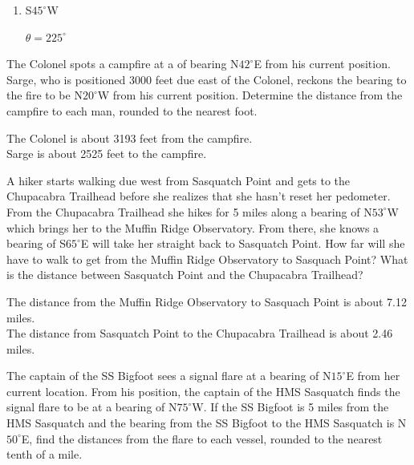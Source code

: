 \documentclass{ximera}
\begin{document}
\begin{question}
\begin{problem}
\begin{enumerate}
\item S$45^{\circ}$W

\begin{solution}
$\theta = 225^{\circ}$
\end{solution}


\end{enumerate}

\end{problem}

\begin{problem}
The Colonel spots a campfire at a of bearing N$42^{\circ}$E from his current position.  Sarge, who is positioned 3000 feet due east of the Colonel, reckons the bearing to the fire to be N$20^{\circ}$W from his current position.  Determine the distance from the campfire to each man, rounded to the nearest foot.

\begin{solution}
The Colonel is about 3193 feet from the campfire. \\
Sarge is about 2525 feet to the campfire.
\end{solution}
\end{problem}

\begin{problem}
A hiker starts walking due west from Sasquatch Point and gets to the Chupacabra Trailhead before she realizes that she hasn't reset her pedometer.  From the Chupacabra Trailhead she hikes for 5 miles along a bearing of N$53^{\circ}$W which brings her to the Muffin Ridge Observatory.  From there, she knows a bearing of S$65^{\circ}$E will take her straight back to Sasquatch Point.  How far will she have to walk to get from the Muffin Ridge Observatory to Sasquach Point?  What is the distance between Sasquatch Point and the Chupacabra Trailhead?

\begin{solution}
The distance from the Muffin Ridge Observatory to Sasquach Point is about 7.12 miles.\\
The distance from Sasquatch Point to the Chupacabra Trailhead is about 2.46 miles.
\end{solution}
\end{problem}

\begin{problem}
The captain of the SS Bigfoot sees a signal flare at a bearing of N$15^{\circ}$E from her current location. From his position, the captain of the HMS Sasquatch finds the signal flare to be at a bearing of N$75^{\circ}$W.  If the SS Bigfoot is 5 miles from the HMS Sasquatch and the bearing from the SS Bigfoot to the HMS Sasquatch is N$50^{\circ}$E, find the distances from the flare to each vessel, rounded to the nearest tenth of a mile.


\end{problem}
\end{question}
\end{document}
